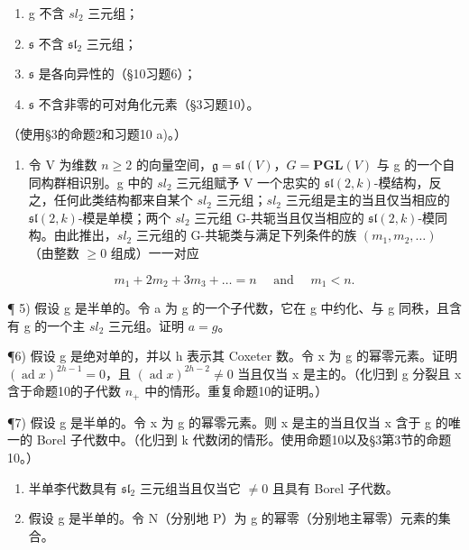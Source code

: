 \begin{enumerate}
\def\labelenumi{(\roman{enumi})}
\item
  g 不含 \(sl_{2}\) 三元组；
\item
  \(\mathfrak{s}\) 不含 \(\mathfrak{sl}_2\) 三元组；
\item
  \(\mathfrak{s}\) 是各向异性的（§10习题6）；
\item
  \(\mathfrak{s}\) 不含非零的可对角化元素（§3习题10）。
\end{enumerate}

（使用§3的命题2和习题10 a)。）

\begin{enumerate}
\def\labelenumi{\arabic{enumi})}
\setcounter{enumi}{3}
\tightlist
\item
  令 V 为维数 \(n \geq 2\) 的向量空间，\(\mathfrak{g} = \mathfrak{sl}(V)\)，\(G = \mathbf{PGL}(V)\) 与 g 的一个自同构群相识别。g 中的 \(sl_{2}\) 三元组赋予 V 一个忠实的 \(\mathfrak{sl}(2, k)\)-模结构，反之，任何此类结构都来自某个 \(sl_{2}\) 三元组；\(sl_{2}\) 三元组是主的当且仅当相应的 \(\mathfrak{sl}(2, k)\)-模是单模；两个 \(sl_{2}\) 三元组 G-共轭当且仅当相应的 \(\mathfrak{sl}(2, k)\)-模同构。由此推出，\(sl_{2}\) 三元组的 G-共轭类与满足下列条件的族 \((m_{1}, m_{2}, \ldots)\)（由整数 \(\geq 0\) 组成）一一对应
\end{enumerate}

\[
m _ {1} + 2 m _ {2} + 3 m _ {3} + \dots = n \quad \text { and } \quad m _ {1} <   n.
\]

¶ 5) 假设 g 是半单的。令 a 为 g 的一个子代数，它在 g 中约化、与 g 同秩，且含有 g 的一个主 \(sl_{2}\) 三元组。证明 \(a = g\)。

¶6) 假设 g 是绝对单的，并以 h 表示其 Coxeter 数。令 x 为 g 的幂零元素。证明 \((\operatorname{ad} x)^{2h-1} = 0\)，且 \((\operatorname{ad} x)^{2h-2} \neq 0\) 当且仅当 x 是主的。（化归到 g 分裂且 x 含于命题10的子代数 \(n_{+}\) 中的情形。重复命题10的证明。）

¶7) 假设 g 是半单的。令 x 为 g 的幂零元素。则 x 是主的当且仅当 x 含于 g 的唯一的 Borel 子代数中。（化归到 k 代数闭的情形。使用命题10以及§3第3节的命题10。）

\begin{enumerate}
\def\labelenumi{\arabic{enumi})}
\setcounter{enumi}{7}
\item
  半单李代数具有 \(\mathfrak{sl}_2\) 三元组当且仅当它 \(\neq 0\) 且具有 Borel 子代数。
\item
  假设 g 是半单的。令 N（分别地 P）为 g 的幂零（分别地主幂零）元素的集合。
\end{enumerate}

